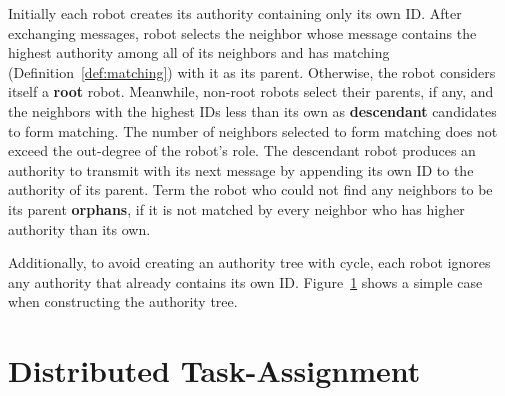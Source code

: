 Initially each robot creates its authority containing only its own ID. 
%
After exchanging messages, robot selects the neighbor whose message contains the highest authority among all of its neighbors and has matching
(Definition~\ref{def:matching}) with it as its parent. 
%
Otherwise, the robot considers itself a \textbf{root} robot. 
%
Meanwhile, non-root robots select their parents, if any, and the neighbors with the highest IDs less than its own as \textbf{descendant} candidates to form matching. 
%
The number of neighbors selected to form matching does not exceed the out-degree of the robot's role. 
%
The descendant robot produces an authority to transmit with its next message by appending its own ID to the authority of its parent. 
%
Term the robot who could not find any neighbors to be its parent \textbf{orphans}, if it is not matched by every neighbor who has higher authority than its own.


Additionally, to avoid creating an authority tree with cycle, each robot ignores any authority that already contains its own ID.
%
Figure~\ref{fig:authtree} shows a simple case when constructing the authority tree.
\begin{figure}
  
  \label{fig:authtree}
\end{figure}

\section{Distributed Task-Assignment}
\label{sec:task-assgin-algo}

